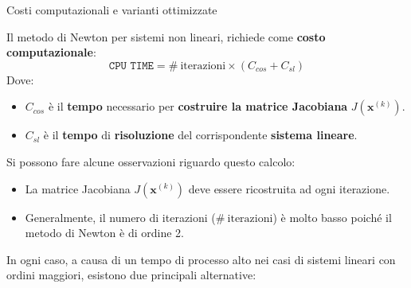 \newpage

\begin{flushleft}
	\textcolor{Green3}{Costi computazionali e varianti ottimizzate}
\end{flushleft}
Il metodo di Newton per sistemi non lineari, richiede come \textbf{costo computazionale}:
\begin{equation}\label{eq: costo computazionale metodo di newton per sistemi non lineari}
	\texttt{CPU TIME} = \# \: \text{iterazioni} \times \left(C_{cos} + C_{sl}\right)
\end{equation}
Dove:
\begin{itemize}
	\item $C_{cos}$ è il \textbf{tempo} necessario per \textbf{costruire la matrice Jacobiana} $J\left(\mathbf{x}^{\left(k\right)}\right)$.
	
	\item $C_{sl}$ è il \textbf{tempo} di \textbf{risoluzione} del corrispondente \textbf{sistema lineare}.
\end{itemize}
Si possono fare alcune osservazioni riguardo questo calcolo:
\begin{itemize}
	\item La matrice Jacobiana $J\left(\mathbf{x}^{\left(k\right)}\right)$ deve essere ricostruita ad ogni iterazione.
	
	\item Generalmente, il numero di iterazioni ($\# \: \text{iterazioni}$) è molto basso poiché il metodo di Newton è di ordine 2.
\end{itemize}
In ogni caso, a causa di un tempo di processo alto nei casi di sistemi lineari con ordini maggiori, esistono due principali alternative:
